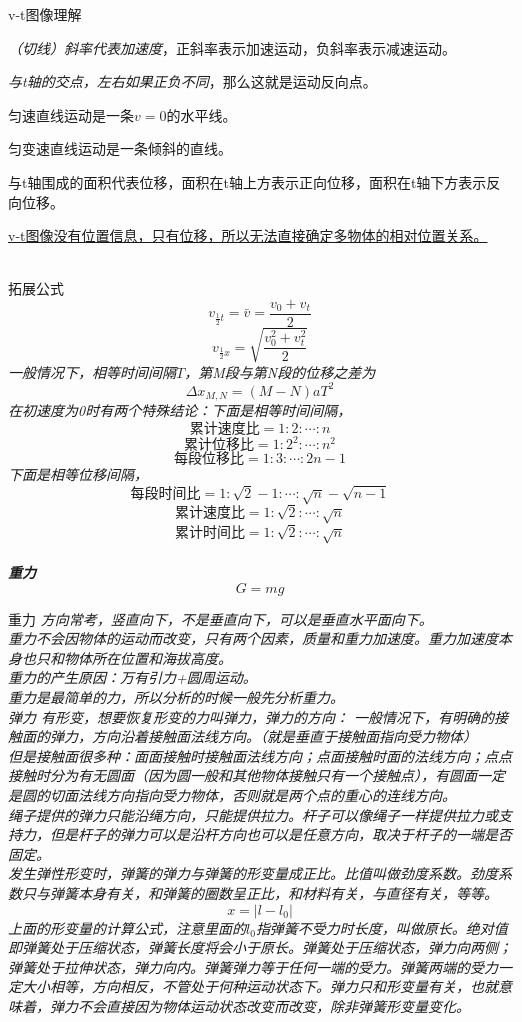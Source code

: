 \documentclass[a4paper, 12pt]{article}
\newcommand{\defitem}[2]{
\noindent \textsf{#1} \hspace{1em} \itshape{#2} \\
}
\newcommand{\formula}[2]{
  \noindent \textbf{#2} \\ \[ #1 \]
}
\begin{document}
\defitem{v-t图像理解}{
  \emph{（切线）斜率代表加速度}，正斜率表示加速运动，负斜率表示减速运动。

  \emph{与t轴的交点，左右如果正负不同}，那么这就是运动反向点。

  匀速直线运动是一条$v=0$的水平线。

  匀变速直线运动是一条倾斜的直线。

  与t轴围成的面积代表位移，面积在t轴上方表示正向位移，面积在t轴下方表示反向位移。

  \underline{v-t图像没有位置信息，只有位移，所以无法直接确定多物体的相对位置关系。}
}
\defitem{拓展公式}{
  \[v_{\frac12t}=\bar v=\frac{v_0+v_t}{2}\]
  \[v_{\frac12x}=\sqrt{\frac{v_0^2+v_t^2}{2}}\]
  一般情况下，相等时间间隔$T$，第M段与第N段的位移之差为
  \[\Delta x_{M,N}=(M-N)aT^2\]
  在初速度为0时有两个特殊结论：下面是相等时间间隔，
  \[\text{累计速度比}=1:2:\cdots:n\]
  \[\text{累计位移比}=1:2^2:\cdots:n^2\]
  \[\text{每段位移比}=1:3:\cdots:2n-1\]
  下面是相等位移间隔，
  \[\text{每段时间比}=1:\sqrt{2}-1:\cdots:\sqrt{n}-\sqrt{n-1}\]
  \[\text{累计速度比}=1:\sqrt{2}:\cdots:\sqrt{n}\]
  \[\text{累计时间比}=1:\sqrt{2}:\cdots:\sqrt{n}\]
}
\formula{G=mg}{重力}
\defitem{重力}{
  方向常考，竖直向下，不是垂直向下，可以是垂直水平面向下。\\
  重力不会因物体的运动而改变，只有两个因素，质量和重力加速度。重力加速度本身也只和物体所在位置和海拔高度。\\
  重力的产生原因：万有引力+圆周运动。\\
  重力是最简单的力，所以分析的时候一般先分析重力。
}
\defitem{弹力}{有形变，想要恢复形变的力叫弹力，弹力的方向：
  一般情况下，有明确的接触面的弹力，方向沿着接触面法线方向。（就是垂直于接触面指向受力物体）\\
  但是接触面很多种：面面接触时接触面法线方向；点面接触时面的法线方向；点点接触时分为有无圆面（因为圆一般和其他物体接触只有一个接触点），有圆面一定是圆的切面法线方向指向受力物体，否则就是两个点的重心的连线方向。\\
  绳子提供的弹力只能沿绳方向，只能提供拉力。杆子可以像绳子一样提供拉力或支持力，但是杆子的弹力可以是沿杆方向也可以是任意方向，取决于杆子的一端是否固定。\\
  发生弹性形变时，弹簧的弹力与弹簧的形变量成正比。比值叫做劲度系数。劲度系数只与弹簧本身有关，和弹簧的圈数呈正比，和材料有关，与直径有关，等等。\\
  \[x=|l-l_0|\]
  上面的形变量的计算公式，注意里面的$l_0$指弹簧不受力时长度，叫做原长。绝对值即弹簧处于压缩状态，弹簧长度将会小于原长。弹簧处于压缩状态，弹力向两侧；弹簧处于拉伸状态，弹力向内。弹簧弹力等于任何一端的受力。弹簧两端的受力一定大小相等，方向相反，不管处于何种运动状态下。弹力只和形变量有关，也就意味着，弹力不会直接因为物体运动状态改变而改变，除非弹簧形变量变化。
}
\end{document}
